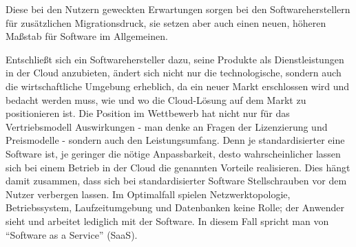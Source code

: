 Diese bei den Nutzern geweckten Erwartungen sorgen bei den Softwareherstellern 
für zusätzlichen Migrationsdruck, sie setzen aber auch einen neuen, höheren 
Maßstab für Software im Allgemeinen.

Entschließt sich ein Softwarehersteller dazu, seine Produkte 
als Dienstleistungen in der Cloud anzubieten, ändert sich nicht nur die 
technologische, sondern auch die wirtschaftliche Umgebung erheblich, da ein 
neuer Markt erschlossen wird und bedacht werden muss, wie und wo die 
Cloud-Lösung auf dem Markt zu positionieren ist. Die Position im Wettbewerb hat 
nicht nur für das Vertriebsmodell  Auswirkungen - man 
denke an Fragen der Lizenzierung und Preismodelle - sondern auch den 
Leistungsumfang. Denn je standardisierter eine Software ist, je 
geringer die nötige Anpassbarkeit, desto wahrscheinlicher lassen sich bei einem 
Betrieb in der 
Cloud die genannten Vorteile realisieren.  Dies 
hängt damit zusammen, dass sich bei standardisierter Software Stellschrauben 
vor dem Nutzer verbergen lassen. Im Optimalfall spielen Netzwerktopologie, 
Betriebssystem, Laufzeitumgebung und Datenbanken keine Rolle; der Anwender 
sieht und arbeitet lediglich mit der Software. In diesem Fall spricht man von 
"`Software as a Service"' (SaaS). 


